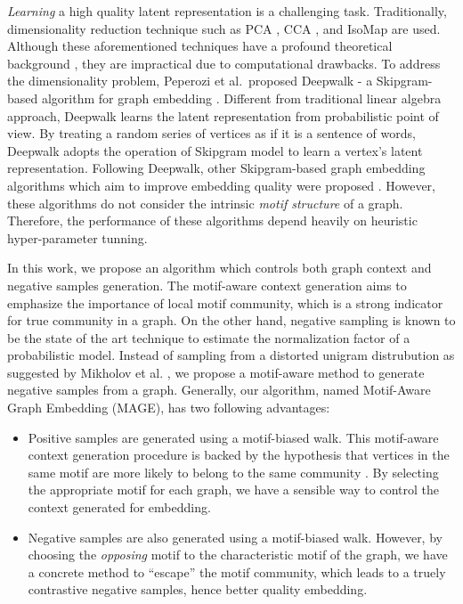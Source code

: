 \documentclass[letterpaper]{article}
\begin{document}

        \emph{Learning} a high quality latent representation is a challenging task. Traditionally,
        dimensionality reduction technique such as PCA \cite{pca}, CCA \cite{cca}, and IsoMap 
        \cite{isomap} are used. Although these aforementioned techniques have a profound theoretical
        background \cite{++++++}, they are impractical due to computational drawbacks. To address
        the dimensionality problem, Peperozi et al.\ proposed Deepwalk - a Skipgram-based algorithm
        for graph embedding \cite{deepwalk}. Different from traditional linear algebra approach,
        Deepwalk learns the latent representation from probabilistic point of view. By treating
        a random series of vertices as if it is a sentence of words, Deepwalk adopts the operation
        of Skipgram model \cite{skipgram} to learn a vertex's latent representation. Following
        Deepwalk, other Skipgram-based graph embedding algorithms which aim to improve embedding
        quality were proposed \cite{GraRep, LINE, platenoid, node2vec}. However, these algorithms
        do not consider the intrinsic \emph{motif structure} of a graph. Therefore, the performance
        of these algorithms depend heavily on heuristic hyper-parameter tunning.


        In this work, we propose an algorithm which controls both graph context and negative samples
        generation. The motif-aware context generation aims to emphasize the importance of local
        motif community, which is a strong indicator for true community in a graph. On the other hand,
        negative sampling is known to be the state of the art technique to estimate the normalization
        factor of a probabilistic model. Instead of sampling from a distorted unigram distrubution as
        suggested by Mikholov et al. \cite{skipgram}, we propose a motif-aware method to generate 
        negative samples from a graph. Generally, our algorithm, named Motif-Aware Graph Embedding (MAGE),
        has two following advantages:

        \begin{itemize}
            \setlength{\parskip}{0pt}
            \item Positive samples are generated using a motif-biased walk. This motif-aware context 
                generation procedure is backed by the hypothesis that vertices in the same motif
                are more likely to belong to the same community \cite{juremotif, harvardmotif}.
                By selecting the appropriate motif for each graph, we have a sensible way to control
                the context generated for embedding.
            \item Negative samples are also generated using a motif-biased walk. However, by choosing
                the \emph{opposing} motif to the characteristic motif of the graph, we have a concrete
                method to ``escape'' the motif community, which leads to a truely contrastive negative
                samples, hence better quality embedding.
        \end{itemize}
\end{document}
